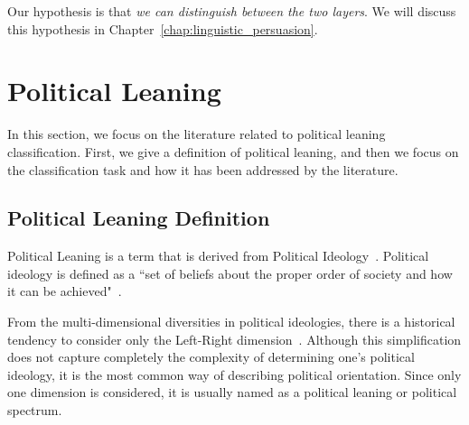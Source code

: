 


Our hypothesis is that \emph{we can distinguish between the two layers}.
We will discuss this hypothesis in Chapter~\ref{chap:linguistic_persuasion}.


\section{\statusgreen Political Leaning}
\label{sec:lit_leaning}

In this section, we focus on the literature related to political leaning classification.
First, we give a definition of political leaning, and then we focus on the classification task and how it has been addressed by the literature.

\subsection{\statusgreen Political Leaning Definition}

Political Leaning is a term that is derived from Political Ideology~\citep{jost2009political}.
Political ideology is defined as a ``set of beliefs about the proper order of society and how it can be achieved"~\citep[p.~64]{erikson2015american}.

From the multi-dimensional diversities in political ideologies, there is a historical tendency to consider only the Left-Right dimension~\citep{jost2009political}.
Although this simplification does not capture completely the complexity of determining one's political ideology, it is the most common way of describing political orientation.
Since only one dimension is considered, it is usually named as a political leaning or political spectrum.


